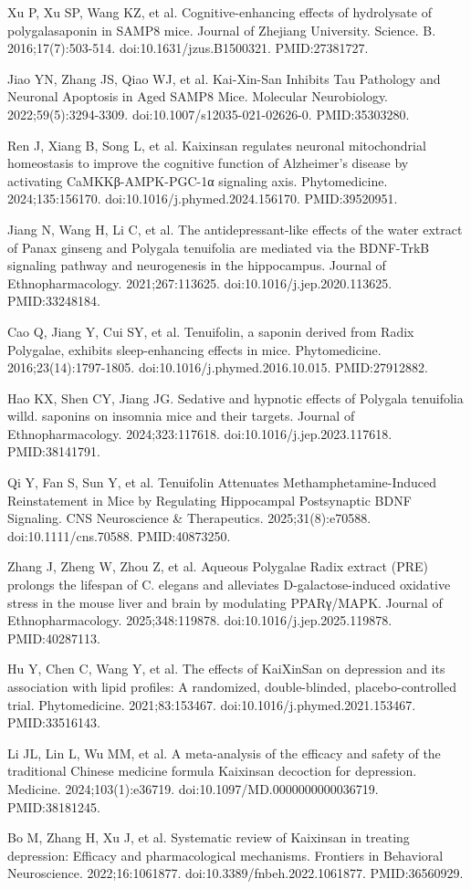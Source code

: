 \documentclass[11pt,oneside]{book}
\newcommand{\reff}[2]{\par\hangindent=7mm\hangafter=1\noindent[#1]\hspace{2mm}#2\par}
\begin{document}
\reff{32}{Xu P, Xu SP, Wang KZ, et al. Cognitive-enhancing effects of hydrolysate of polygalasaponin in SAMP8 mice. Journal of Zhejiang University. Science. B. 2016;17(7):503-514. doi:10.1631/jzus.B1500321. PMID:27381727.}
\reff{33}{Jiao YN, Zhang JS, Qiao WJ, et al. Kai-Xin-San Inhibits Tau Pathology and Neuronal Apoptosis in Aged SAMP8 Mice. Molecular Neurobiology. 2022;59(5):3294-3309. doi:10.1007/s12035-021-02626-0. PMID:35303280.}
\reff{34}{Ren J, Xiang B, Song L, et al. Kaixinsan regulates neuronal mitochondrial homeostasis to improve the cognitive function of Alzheimer's disease by activating CaMKKβ-AMPK-PGC-1α signaling axis. Phytomedicine. 2024;135:156170. doi:10.1016/j.phymed.2024.156170. PMID:39520951.}
\reff{35}{Jiang N, Wang H, Li C, et al. The antidepressant-like effects of the water extract of Panax ginseng and Polygala tenuifolia are mediated via the BDNF-TrkB signaling pathway and neurogenesis in the hippocampus. Journal of Ethnopharmacology. 2021;267:113625. doi:10.1016/j.jep.2020.113625. PMID:33248184.}
\reff{36}{Cao Q, Jiang Y, Cui SY, et al. Tenuifolin, a saponin derived from Radix Polygalae, exhibits sleep-enhancing effects in mice. Phytomedicine. 2016;23(14):1797-1805. doi:10.1016/j.phymed.2016.10.015. PMID:27912882.}
\reff{37}{Hao KX, Shen CY, Jiang JG. Sedative and hypnotic effects of Polygala tenuifolia willd. saponins on insomnia mice and their targets. Journal of Ethnopharmacology. 2024;323:117618. doi:10.1016/j.jep.2023.117618. PMID:38141791.}
\reff{38}{Qi Y, Fan S, Sun Y, et al. Tenuifolin Attenuates Methamphetamine-Induced Reinstatement in Mice by Regulating Hippocampal Postsynaptic BDNF Signaling. CNS Neuroscience \& Therapeutics. 2025;31(8):e70588. doi:10.1111/cns.70588. PMID:40873250.}
\reff{39}{Zhang J, Zheng W, Zhou Z, et al. Aqueous Polygalae Radix extract (PRE) prolongs the lifespan of C. elegans and alleviates D-galactose-induced oxidative stress in the mouse liver and brain by modulating PPARγ/MAPK. Journal of Ethnopharmacology. 2025;348:119878. doi:10.1016/j.jep.2025.119878. PMID:40287113.}
\reff{40}{Hu Y, Chen C, Wang Y, et al. The effects of KaiXinSan on depression and its association with lipid profiles: A randomized, double-blinded, placebo-controlled trial. Phytomedicine. 2021;83:153467. doi:10.1016/j.phymed.2021.153467. PMID:33516143.}
\reff{41}{Li JL, Lin L, Wu MM, et al. A meta-analysis of the efficacy and safety of the traditional Chinese medicine formula Kaixinsan decoction for depression. Medicine. 2024;103(1):e36719. doi:10.1097/MD.0000000000036719. PMID:38181245.}
\reff{42}{Bo M, Zhang H, Xu J, et al. Systematic review of Kaixinsan in treating depression: Efficacy and pharmacological mechanisms. Frontiers in Behavioral Neuroscience. 2022;16:1061877. doi:10.3389/fnbeh.2022.1061877. PMID:36560929.}
\end{document}
